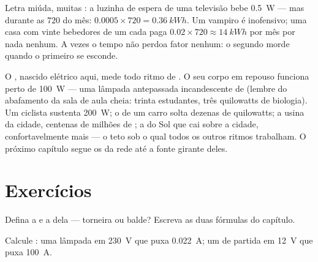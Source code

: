 \begin{example}\label{ex:g9:electric-power-energy:standby}
Letra miúda, muitas : a luzinha de espera de uma televisão bebe
\qty{0.5}{W} --- mas durante as $720$  do mês:
$0.0005 \times 720 = \qty{0.36}{kWh}$. Um vampiro é inofensivo; uma
casa com vinte bebedores de um  cada paga
$0.02 \times 720 \approx \qty{14}{kWh}$ por mês por nada nenhum. A
 vezes o tempo não perdoa fator nenhum: o segundo morde
quando o primeiro se esconde.
\end{example}

\begin{remark}\label{rem:g9:electric-power-energy:wider}
O , nascido elétrico aqui, mede todo ritmo de . O seu
corpo em repouso funciona perto de \qty{100}{W} --- uma lâmpada
antepassada incandescente de  (lembre do abafamento da sala de
aula cheia: trinta estudantes, três quilowatts de biologia). Um
ciclista sustenta \qty{200}{W}; o  de um carro solta dezenas de
quilowatts; a usina da cidade, centenas de milhões de ; a  do
Sol que cai sobre a cidade, confortavelmente mais --- o teto sob o
qual todos os outros ritmos trabalham. O próximo capítulo segue os
 da rede até a fonte girante deles.
\end{remark}

\section{Exercícios}

\begin{exercise}[$\star$]\label{exo:g9:electric-power-energy:1}
Defina a  e a  dela --- torneira ou balde? Escreva as
duas fórmulas do capítulo.
\end{exercise}

\begin{exercise}[$\star$]\label{exo:g9:electric-power-energy:2}
Calcule : uma lâmpada em \qty{230}{V} que puxa
\qty{0.022}{A}; um  de partida em \qty{12}{V} que puxa
\qty{100}{A}.
\end{exercise}

